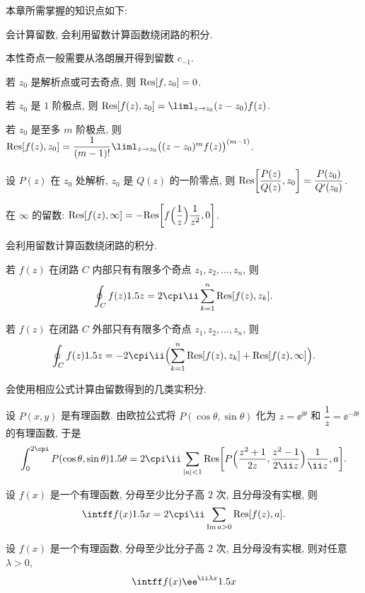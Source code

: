 本章所需掌握的知识点如下:
\begin{conclusion}
  \item 会计算留数, 会利用留数计算函数绕闭路的积分.
  \begin{conclusion}
    \item 本性奇点一般需要从洛朗展开得到留数 $c_{-1}$.
    \item 若 $z_0$ 是解析点或可去奇点, 则 ${\mathrm{Res}}[f,z_0]=0$.
    \item 若 $z_0$ 是 $1$ 阶极点, 则 $\Res[f(z),z_0]=\liml_{z\ra z_0}(z-z_0)f(z)$.
    \item 若 $z_0$ 是至多 $m$ 阶极点, 则 $\Res[f(z),z_0]=\dfrac1{(m-1)!}\liml_{z\ra z_0}\bigl((z-z_0)^mf(z)\bigr)^{(m-1)}$.
    \item 设 $P(z)$ 在 $z_0$ 处解析, $z_0$ 是 $Q(z)$ 的一阶零点, 则 ${\mathrm{Res}}\biggl[\dfrac{P(z)}{Q(z)},z_0\biggr]=\dfrac{P(z_0)}{Q'(z_0)}$.
    \item 在 $\infty$ 的留数: ${\mathrm{Res}}[f(z),\infty]
        =-{\mathrm{Res}}\biggl[f\Bigl(\dfrac1z\Bigr)\dfrac1{z^2},0\biggr]$.
  \end{conclusion}
  \item 会利用留数计算函数绕闭路的积分.
  \begin{conclusion}
    \item 若 $f(z)$ 在闭路 $C$ 内部只有有限多个奇点 $z_1,z_2,\dots,z_n$, 则
    \[
      \oint_C f(z)\d z=2\cpi\ii\sum_{k=1}^n\Res[f(z),z_k].
    \]
    \item 若 $f(z)$ 在闭路 $C$ 外部只有有限多个奇点 $z_1,z_2,\dots,z_n$, 则
    \[
      \oint_C f(z)\d z=-2\cpi\ii\Bigl(\sum_{k=1}^n\Res[f(z),z_k]+\Res[f(z),\infty]\Bigr).
    \]
  \end{conclusion}
  \item 会使用相应公式计算由留数得到的几类实积分.
  \begin{conclusion}
    \item 设 $P(x,y)$ 是有理函数.
    由欧拉公式将 $P(\cos \theta,\sin\theta)$ 化为 $z=\ee^{\ii\theta}$ 和 $\dfrac1z=\ee^{-\ii\theta}$ 的有理函数, 于是
    \[
        \int_0^{2\cpi}P(\cos \theta,\sin\theta)\d\theta
      =2\cpi\ii\sum_{\abs{a}<1}\Res\biggl[P\Bigl(\frac{z^2+1}{2z},\frac{z^2-1}{2\ii z}\Bigr)\frac1{\ii z},a\biggr].
    \]
    \item 设 $f(x)$ 是一个有理函数, 分母至少比分子高 $2$ 次, 且分母没有实根, 则
    \[
       \intff f(x)\d x
      =2\cpi\ii\sum_{\Im a>0}\Res[f(z),a].
    \]
    \item 设 $f(x)$ 是一个有理函数, 分母至少比分子高 $2$ 次, 且分母没有实根, 则对任意 $\lambda>0$,
    \[
       \intff f(x)\ee^{\ii \lambda x}\d x
\]
\end{conclusion}
\end{conclusion}
